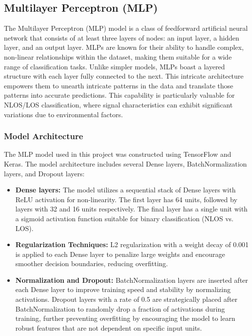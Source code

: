 \documentclass[
	article, %
	11pt, %
	draft, %
]{CSUniSchoolLabReport}
\begin{document}
\subsection{Multilayer Perceptron (MLP)}\label{mlp}                                                                                 
The Multilayer Perceptron (MLP) model is a class of feedforward artificial neural network that consists of at least three layers of nodes: an input layer, a hidden layer, and an output layer. MLPs are known for their ability to handle complex, non-linear relationships within the dataset, making them suitable for a wide range of classification tasks. Unlike simpler models, MLPs boast a layered structure with each layer fully connected to the next. This intricate architecture empowers them to unearth intricate patterns in the data and translate those patterns into accurate predictions. This capability is particularly valuable for NLOS/LOS classification, where signal characteristics can exhibit significant variations due to environmental factors.

\subsubsection{Model Architecture}

The MLP model used in this project was constructed using TensorFlow and Keras. The model architecture includes several Dense layers, BatchNormalization layers, and Dropout layers:

\begin{itemize}
    \item \textbf{Dense layers:} The model utilizes a sequential stack of Dense layers with ReLU activation for non-linearity. The first layer has 64 units, followed by layers with 32 and 16 units respectively. The final layer has a single unit with a sigmoid activation function suitable for binary classification (NLOS vs. LOS).
    \item \textbf{Regularization Techniques:} L2 regularization with a weight decay of 0.001 is applied to each Dense layer to penalize large weights and encourage smoother decision boundaries, reducing overfitting.
    \item \textbf{Normalization and Dropout:} BatchNormalization layers are inserted after each Dense layer to improve training speed and stability by normalizing activations. Dropout layers with a rate of 0.5 are strategically placed after BatchNormalization to randomly drop a fraction of activations during training, further preventing overfitting by encouraging the model to learn robust features that are not dependent on specific input units.
\end{itemize}
\end{document}
